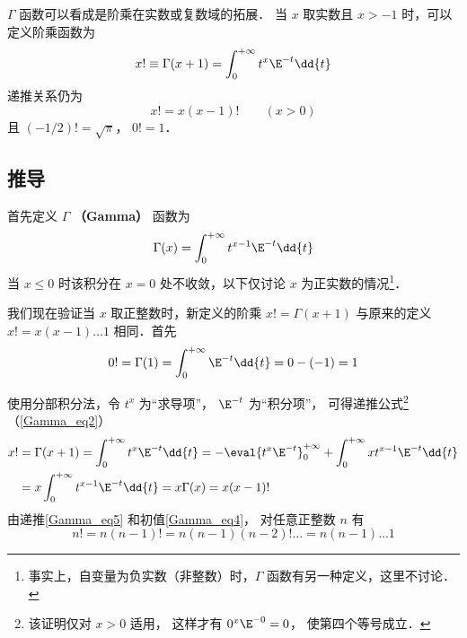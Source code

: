 

$\Gamma$ 函数可以看成是阶乘在实数或复数域的拓展． 当 $x$ 取实数且 $x>-1$ 时，可以定义阶乘函数为
\begin{equation}\label{Gamma_eq1}
x! \equiv \Gamma (x + 1) = \int_0^{+\infty} t^x \E^{-t} \dd{t}
\end{equation}
递推关系仍为
\begin{equation}\label{Gamma_eq2}
x!=x(x-1)! \qquad (x>0)
\end{equation}
且 $(-1/2)!=\sqrt{\pi}$，  $0! = 1$．

\subsection{推导}

首先定义 $\Gamma$ \textbf{（Gamma）} 函数为
\begin{equation}
\Gamma(x) = \int_0^{+\infty} t^{x-1} \E^{-t} \dd{t}
\end{equation}
当 $x \leqslant 0$ 时该积分在 $x=0$ 处不收敛，以下仅讨论 $x$ 为正实数的情况\footnote{事实上，自变量为负实数（非整数）时，$\Gamma$ 函数有另一种定义，这里不讨论．}．

我们现在验证当 $x$ 取正整数时，新定义的阶乘 $x! = \Gamma(x+1)$ 与原来的定义 $x! = x(x-1)\dots 1$ 相同．首先
\begin{equation}\label{Gamma_eq4}
0! = \Gamma(1) = \int_0^{+\infty} \E^{-t} \dd{t} = 0 - (-1) = 1
\end{equation}

使用分部积分法，令 $t^x$ 为“求导项”， $\E^{-t}$ 为“积分项”， 可得递推公式\footnote{该证明仅对 $x>0$ 适用， 这样才有 $0^x \E^{-0} = 0$， 使第四个等号成立．}（\autoref{Gamma_eq2}）
\begin{equation}\label{Gamma_eq5}
\begin{aligned}
x! &= \Gamma(x+1) = \int_0^{+\infty} t^x \E^{-t} \dd{t} =  - \eval{t^x \E^{-t}}_{0}^{+\infty} + \int_0^{+\infty} x t^{x-1} \E^{-t} \dd{t} \\
&= x\int_0^{+\infty} t^{x-1} \E^{-t} \dd{t} = x\Gamma (x) = x(x-1)!
\end{aligned} \end{equation} 
由递推\autoref{Gamma_eq5} 和初值\autoref{Gamma_eq4}， 对任意正整数 $n$ 有
\begin{equation}
n! = n(n-1)! = n(n-1)(n-2)!... = n(n-1)...1
\end{equation}


